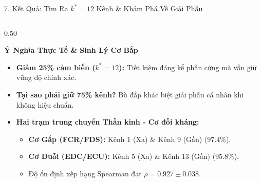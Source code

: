 \documentclass[aspectratio=169,10pt]{beamer}
\begin{document}
\begin{frame}{7. Kết Quả: Tìm Ra $k^*=12$ Kênh \& Khám Phá Về Giải Phẫu}
\begin{columns}[T,onlytextwidth]
        \begin{column}{0.50\textwidth}
            \begin{block}{\textbf{Ý Nghĩa Thực Tế \& Sinh Lý Cơ Bắp}}
                \scriptsize
                \begin{itemize}
                    \item \textbf{Giảm 25\% cảm biến ($k^*=12$):} Tiết kiệm đáng kể phần cứng mà vẫn giữ vững độ chính xác.
                    \item \textbf{Tại sao phải giữ 75\% kênh?} Bù đắp khác biệt giải phẫu cá nhân khi không hiệu chuẩn.
                    \item \textbf{Hai trạm trung chuyển Thần kinh - Cơ đối kháng:}
                    \begin{itemize}
                        \item \textbf{Cơ Gấp (FCR/FDS):} Kênh 1 (Xa) \& Kênh 9 (Gần) ($97.4\%$).
                        \item \textbf{Cơ Duỗi (EDC/ECU):} Kênh 5 (Xa) \& Kênh 13 (Gần) ($95.8\%$).
                        \item Độ ổn định xếp hạng Spearman đạt $\rho = 0.927 \pm 0.038$.
                    \end{itemize}
                \end{itemize}
            \end{block}
        \end{column}
    \end{columns}
\end{frame}
\end{document}
